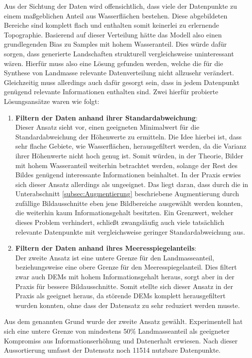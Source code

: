 Aus der Sichtung der Daten wird offensichtlich, dass viele der Datenpunkte zu einem maßgeblichen Anteil aus Wasserflächen bestehen. Diese abgebildeten Bereiche sind komplett flach und enthalten somit keinerlei zu erlernende Topographie. Basierend auf dieser Verteilung hätte das Modell also einen grundlegenden Bias zu Samples mit hohem Wasseranteil. Dies würde dafür sorgen, dass generierte Landschaften strukturell vergleichsweise uninteressant wären. Hierfür muss also eine Lösung gefunden werden, welche die für die Synthese von Landmasse relevante Datenverteilung nicht allzusehr verändert. Gleichzeitig muss allerdings auch dafür gesorgt sein, dass in jedem Datenpunkt genügend relevante Informationen enthalten sind. Zwei hierfür probierte Lösungsansätze waren wie folgt:
\begin{enumerate}
    \item \textbf{Filtern der Daten anhand ihrer Standardabweichung}: \\
    Dieser Ansatz sieht vor, einen geeigneten Minimalwert für die Standardabweichung der Höhenwerte zu ermitteln. Die Idee hierbei ist, dass sehr flache Gebiete, wie Wasserflächen, herausgefiltert werden, da die Varianz ihrer Höhenwerte nicht hoch genug ist. Somit würden, in der Theorie, Bilder mit hohem Wasseranteil weiterhin betrachtet werden, solange der Rest des Bildes genügend interessante Informationen beinhaltet. In der Praxis erwies sich dieser Ansatz allerdings als ungeeignet. Das liegt daran, dass durch die in Unterabschnitt \ref{subsec:Augmentierung} beschriebene Augmentierung durch zufällige Bildausschnitte eben jene Bildbereiche ausgewählt werden konnten, die weiterhin kaum Informationsgehalt besitzten. Ein Grenzwert, welcher dieses Problem verhindert, schließt zwangsläufig auch viele tatsächlich relevante Datenpunkte mit vergleichsweise geringer Standardabweichung aus.
    \item \textbf{Filtern der Daten anhand ihres Meeresspiegelanteils}: \\
    Der zweite Ansatz ist eine untere Grenze für den Landmasseanteil, beziehungsweise eine obere Grenze für den Meeresspiegelanteil. Dies filtert zwar auch \ac{DEM}s mit hohem Informationsgehalt heraus, sorgt aber in der Praxis für bessere Bildausschnitte. Somit stellte sich dieser Ansatz in der Praxis als geeignet heraus, da störende \ac{DEM}s komplett herausgefiltert wurden konnten, ohne dass der Datensatz zu sehr reduziert werden musste.
\end{enumerate}
Aus dem genannten Grund wurde der zweite Ansatz gewählt. Experimentell hat sich eine untere Grenze von mindestens 50\% Landmasseanteil als geeigneter Kompromiss aus Informationserhöhung und Datenerhalt erwiesen. Nach dieser Aussortierung umfasst der Datensatz noch 11514 nutzbare Datenpunkte.

